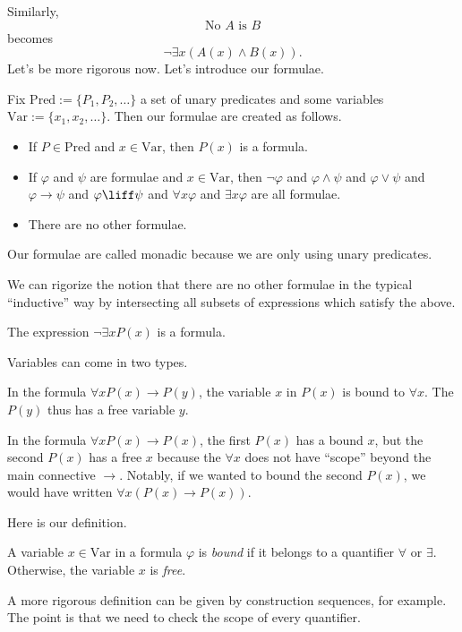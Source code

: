 Similarly,
\[\textrm{No $A$ is $B$}\]
becomes
\[\lnot\exists x(A(x)\land B(x)).\]
Let's be more rigorous now. Let's introduce our formulae.
\begin{definition}
	Fix $\mathrm{Pred}:=\{P_1,P_2,\ldots\}$ a set of unary predicates and some variables $\mathrm{Var}:=\{x_1,x_2,\ldots\}$. Then our formulae are created as follows.
	\begin{itemize}
		\item If $P\in\mathrm{Pred}$ and $x\in\mathrm{Var}$, then $P(x)$ is a formula.
		\item If $\varphi$ and $\psi$ are formulae and $x\in\mathrm{Var}$, then $\lnot\varphi$ and $\varphi\land\psi$ and $\varphi\lor\psi$ and $\varphi\to\psi$ and $\varphi\liff\psi$ and $\forall x\varphi$ and $\exists x\varphi$ are all formulae.
		\item There are no other formulae.
	\end{itemize}
\end{definition}
\begin{remark}
	Our formulae are called monadic because we are only using unary predicates.
\end{remark}
\begin{remark}
	We can rigorize the notion that there are no other formulae in the typical ``inductive'' way by intersecting all subsets of expressions which satisfy the above.
\end{remark}
\begin{example}
	The expression $\lnot\exists xP(x)$ is a formula.
\end{example}
Variables can come in two types.
\begin{example}
	In the formula $\forall xP(x)\to P(y)$, the variable $x$ in $P(x)$ is bound to $\forall x$. The $P(y)$ thus has a free variable $y$.
\end{example}
\begin{example}
	In the formula $\forall xP(x)\to P(x)$, the first $P(x)$ has a bound $x$, but the second $P(x)$ has a free $x$ because the $\forall x$ does not have ``scope'' beyond the main connective $\to$. Notably, if we wanted to bound the second $P(x)$, we would have written $\forall x(P(x)\to P(x))$.
\end{example}
Here is our definition.
\begin{definition}
	A variable $x\in\mathrm{Var}$ in a formula $\varphi$ is \textit{bound} if it belongs to a quantifier $\forall$ or $\exists$. Otherwise, the variable $x$ is \textit{free}.
\end{definition}
A more rigorous definition can be given by construction sequences, for example. The point is that we need to check the scope of every quantifier.

